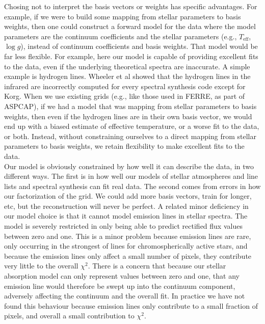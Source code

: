 \documentclass[modern]{aastex631}
\begin{document}
Chosing not to interpret the basis vectors or weights has specific advantages. For example, if we were to build some mapping from stellar parameters to basis weights, then one could construct a forward model for the data where the model parameters are the continuum coefficients and the stellar parameters (e.g., $T_\mathrm{eff}$, $\log{g}$), instead of continuum coefficients and basis weights. That model would be far less flexible. For example, here our model is capable of providing excellent fits to the data, even if the underlying theoretical spectra are inaccurate. A simple example is hydrogen lines. Wheeler et al showed that the hydrogen lines in the infrared are incorrectly computed for every spectral synthesis code except for Korg. When we use existing grids (e.g., like those used in FERRE, as part of ASPCAP), if we had a model that was mapping from stellar parameters to basis weights, then even if the hydrogen lines are in their own basis vector, we would end up with a biased estimate of effective temperature, or a worse fit to the data, or both. Instead, without constraining ourselves to a direct mapping from stellar parameters to basis weights, we retain flexibility to make excellent fits to the data.\\

Our model is obviously constrained by how well it can describe the data, in two different ways. The first is in how well our models of stellar atmospheres and line lists and spectral synthesis can fit real data. The second comes from errors in how our factorization of the grid. We could add more basis vectors, train for longer, etc, but the reconstruction will never be perfect. A related minor deficiency in our model choice is that it cannot model emission lines in stellar spectra. The model is severely restricted in only being able to predict rectified flux values between zero and one. This is a minor problem because emission lines are rare, only occurring in the strongest of lines for chromospherically active stars, and because the emission lines only affect a small number of pixels, they contribute very little to the overall $\chi^2$. There is a concern that because our stellar absorption model can only represent values between zero and one, that any emission line would therefore be swept up into the continuum component, adversely affecting the continuum and the overall fit. In practice we have not found this behaviour because emission lines only contribute to a small fraction of pixels, and overall a small contribution to $\chi^2$.\\
\end{document}
